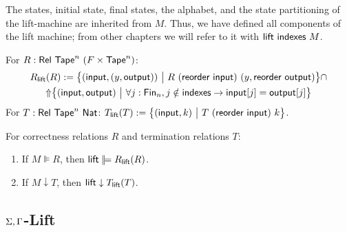 \documentclass{psartcl}
\begin{document}
The states, initial state, final states, the alphabet, and the state partitioning of the lift-machine are inherited from $M$.
Thus, we have defined all components of the lift machine; from other chapters we will refer to it with $\textsf{lift}~\textsf{indexes}~M$.

\begin{definition}
  \label{def:m,n-rellift}
  For $R : \mathsf{Rel}~\textsf{Tape}^{n}~(F \times \textsf{Tape}^{n})$:
  \begin{multline*}
    R_{\textsf{lift}}(R) := \bigl\{ (\textsf{input}, (y, \textsf{output}))~\big|~R~(\textsf{reorder}~\textsf{input})~(y,\textsf{reorder}~\textsf{output}) \bigr \} \cap \\
    \operatorname{\Uparrow} \bigl\{ (\textsf{input},\textsf{output})~\big|~\forall j:\textsf{Fin}_n, j \notin \textsf{indexes} \rightarrow \textsf{input}[j] = \textsf{output}[j] \bigr \}
  \end{multline*}
  For $T : \mathsf{Rel}~\textsf{Tape}^{n}~\textsf{Nat}$: $ T_{\textsf{lift}}(T) := \bigl\{ (\textsf{input}, k)~\big|~T~(\textsf{reorder}~\textsf{input})~k \bigr \} $.
\end{definition}

\begin{lemma}
  \label{lem:m,n-correctness}
  For correctness relations $R$ and termination relations $T$:
  \begin{enumerate}
    \item
      If $M \VDash R$, then $\MS{lift} \VDash R_{\MS{lift}}(R)$.
    \item
      If $M \downarrow T$, then $\textsf{lift} \downarrow T_{\textsf{lift}}(T)$.
  \end{enumerate}
\end{lemma}

\subsection{\texorpdfstring{$\Sigma,\Gamma$}{Sigma,Gamma}-Lift}
\label{sub:sigma-gamma}
\end{document}
